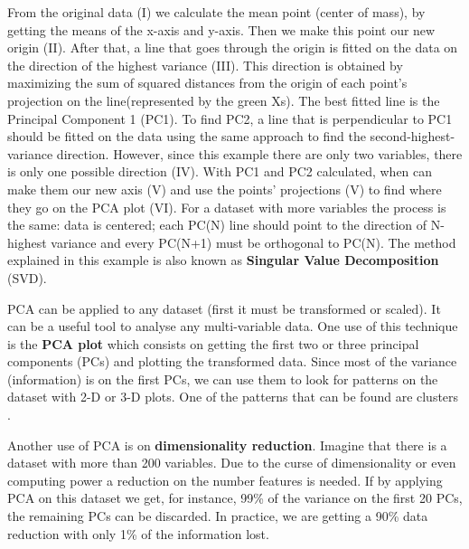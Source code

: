 From the original data (I) we calculate the mean point (center of mass), by getting the means of the x-axis and y-axis. Then we make this point our new origin (II). After that, a line that goes through the origin is fitted on the data on the direction of the highest variance (III). This direction is obtained by maximizing the sum of squared distances from the origin of each point's projection on the line(represented by the green Xs). The best fitted line is the Principal Component 1 (PC1). To find PC2, a line that is perpendicular to PC1 should be fitted on the data using the same approach to find the second-highest-variance direction. However, since this example there are only two variables, there is only one possible direction (IV). With PC1 and PC2 calculated, when can make them our new axis (V) and use the points' projections (V) to find where they go on the PCA plot (VI). For a dataset with more variables the process is the same: data is centered; each PC(N) line should point to the direction of N-highest variance and every PC(N+1) must be orthogonal to PC(N). The method explained in this example is also known as \textbf{Singular Value Decomposition} (SVD).

PCA can be applied to any dataset \cite{wold1987principal} (first it must be transformed or scaled). It can be a useful tool to analyse any multi-variable data. One use of this technique is the \textbf{PCA plot} which consists on getting the first two or three principal components (PCs) and plotting the transformed data. Since most of the variance (information) is on the first PCs, we can use them to look for patterns on the dataset with 2-D or 3-D plots. One of the patterns that can be found are clusters \cite{ding2004k}. 

Another use of PCA is on \textbf{dimensionality reduction}. Imagine that there is a dataset with more than 200 variables. Due to the curse of dimensionality \cite{Bellman:2010:DP:1893145} or even computing power a reduction on the number features is needed. If by applying PCA on this dataset we get, for instance, 99\% of the variance on the first 20 PCs, the remaining PCs can be discarded. In practice, we are getting a 90\% data reduction with only 1\% of the information lost.





